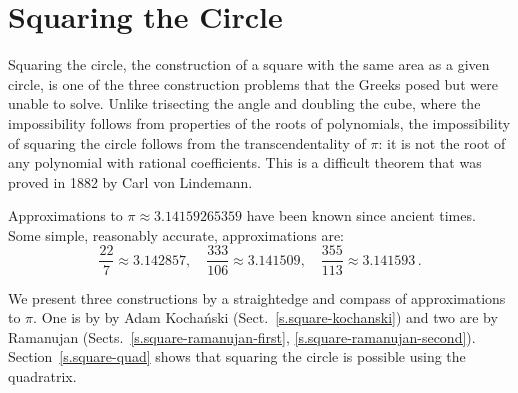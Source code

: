
\chapter{Squaring the Circle}\label{c.square}




Squaring the circle, the construction of a square with the same area as a given circle, is one of the three construction problems that the Greeks posed but were unable to solve. Unlike trisecting the angle and doubling the cube, where the impossibility follows from properties of the roots of polynomials, the impossibility of squaring the circle follows from the transcendentality of $\pi$: it is not the root of any polynomial with rational coefficients. This is a difficult theorem that was proved in 1882 by Carl von Lindemann.

Approximations to $\pi\approx 3.14159265359$ have been known since ancient times. Some simple, reasonably accurate, approximations are:
\[
\displaystyle\frac{22}{7}\approx 3.142857,\quad \displaystyle\frac{333}{106}\approx 3.141509,\quad \displaystyle\frac{355}{113}\approx 3.141593\,.
\]

We present three constructions by a straightedge and compass of  approximations to $\pi$. One is by by Adam Kocha\'{n}ski (Sect.~\ref{s.square-kochanski}) and two are by Ramanujan (Sects.~\ref{s.square-ramanujan-first}, \ref{s.square-ramanujan-second}). Section~\ref{s.square-quad} shows that squaring the circle is possible using the quadratrix.

